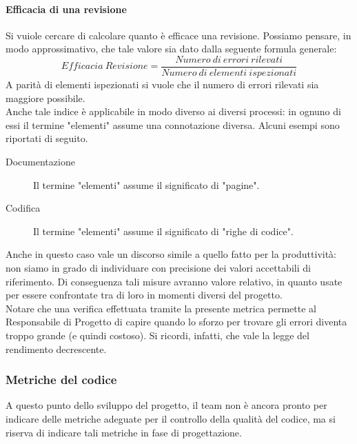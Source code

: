 				\paragraph{Efficacia di una revisione}
					Si vuiole cercare di calcolare quanto è efficace una revisione. Possiamo pensare, in modo approssimativo, che tale valore sia dato 
					dalla seguente formula generale:
					\begin{equation}
						\label{Efficacia revisione}
						Efficacia\ Revisione = \frac{Numero\ di\ errori\ rilevati}{Numero\ di\ elementi\ ispezionati}
					\end{equation}
					A parità di elementi ispezionati si vuole che il numero di errori rilevati sia maggiore possibile.\\
					Anche tale indice è applicabile in modo diverso ai diversi processi: in ognuno di essi il termine "elementi" assume una connotazione 
					diversa. Alcuni esempi sono riportati di seguito.
					\begin{description}
						\item[Documentazione] Il termine "elementi" assume il significato di "pagine".
						\item[Codifica] Il termine "elementi" assume il significato di "righe di codice".
					\end{description}
					Anche in questo caso vale un discorso simile a quello fatto per la produttività: non siamo in grado di individuare con 
					precisione dei valori accettabili di riferimento. Di conseguenza tali misure avranno valore relativo, in quanto usate per essere 
					confrontate tra di loro in momenti diversi del progetto.\\
					Notare che una verifica effettuata tramite la presente metrica permette al Responsabile di Progetto di capire quando lo sforzo per 
					trovare gli errori diventa troppo grande (e quindi costoso). Si ricordi, infatti, che vale la legge del rendimento decrescente.
		\subsubsection{Metriche del codice}
			A questo punto dello sviluppo del progetto, il team non è ancora pronto per indicare delle metriche adeguate per il controllo della 
			qualità del codice, ma si riserva di indicare tali metriche in fase di progettazione.
